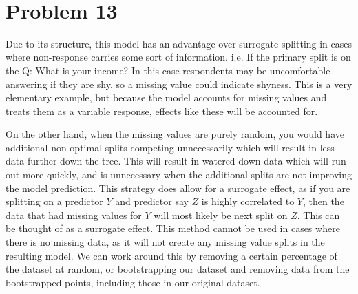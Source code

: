 \documentclass[11pt]{article}
\begin{document}
\begin{center}

\ \\
\end{center}


\section*{Problem 13}

\vspace{5 mm}
\noindent
Due to its structure, this model has an advantage over surrogate splitting in 
cases where non-response carries some sort of information.  i.e. If the primary 
split is on the Q: What is your income? In this case respondents may be 
uncomfortable answering if they are shy, so a missing value could indicate 
shyness.  This is a very elementary example, but because the model accounts for 
missing values and treats them as a variable response, effects like these will 
be accounted for.  

\vspace{5 mm}
\noindent
On the other hand, when the missing values are purely random, you would have additional 
non-optimal splits competing unnecessarily which will result in less data 
further down the tree.  This will result in watered down data which will run 
out more quickly, and is unnecessary when the additional splits are not 
improving the model prediction.  This strategy does allow for a surrogate 
effect, as if you are splitting on a predictor $Y$ and predictor say  $Z$ is highly 
correlated to $Y$, then the data that had missing values for $Y$ will most 
likely be next split on $Z$.  This can be thought of as a surrogate effect.  
This method cannot be used in cases where there is no missing data, as it will 
not create any missing value splits in the resulting model.  We can work around 
this by removing a certain percentage of the dataset at random, or 
bootstrapping our dataset and removing data from the bootstrapped points, 
including those in our original dataset.
\end{document}
